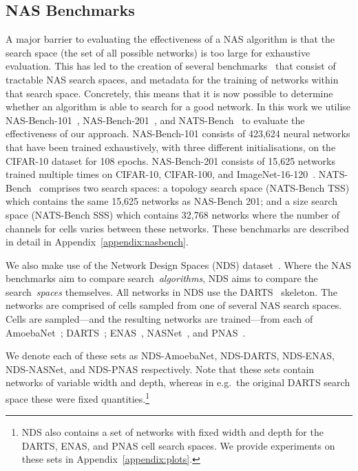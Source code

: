 \documentclass{article}
\begin{document}
\subsection{NAS Benchmarks}
\label{sec:nasbench101}
A major barrier to evaluating the effectiveness of a NAS algorithm is that the search space (the set of all possible networks) is too large for exhaustive evaluation. This has led to the creation of several benchmarks~\citep{ying2019bench,Zela2020NAS-Bench-1Shot1:,Dong2020NAS-Bench-201,dong2021nats} that consist of tractable NAS search spaces, and metadata for the training of networks within that search space. Concretely, this means that it is now possible to determine whether an algorithm is able to search for a good network. In this work we utilise NAS-Bench-101~\citep{ying2019bench}, NAS-Bench-201~\citep{Dong2020NAS-Bench-201}, and NATS-Bench~\citep{dong2021nats} to evaluate the effectiveness of our approach. NAS-Bench-101 consists of 423,624 neural networks that have been trained exhaustively, with three different initialisations, on the CIFAR-10 dataset for 108 epochs. NAS-Bench-201 consists of 15,625 networks trained multiple times on CIFAR-10, CIFAR-100, and ImageNet-16-120~\citep{chrabaszcz2017downsampled}. NATS-Bench~\citep{dong2021nats} comprises two search spaces: a topology search space (NATS-Bench TSS) which contains the same 15,625 networks as NAS-Bench 201; and a size search space (NATS-Bench SSS) which contains 32,768 networks where the number of channels for cells varies between these networks.
These benchmarks are described in detail in Appendix~\ref{appendix:nasbench}.


We also make use of the Network Design Spaces (NDS) dataset~\citep{radosavovic2019network}. Where the NAS benchmarks aim to compare search~\textit{algorithms}, NDS aims to compare the search~\textit{spaces} themselves. All networks in NDS use the DARTS~\citep{liu2019darts} skeleton. The networks are comprised of cells sampled from one of several NAS search spaces. Cells are sampled---and the resulting networks are trained---from each of AmoebaNet~\citep{real2019regularized}; DARTS~\citep{liu2019darts}; ENAS~\citep{pham2018efficient},  NASNet~\citep{zoph2017neural}, and
PNAS~\citep{liu2018progressive}. 

We denote each of these sets as NDS-AmoebaNet, NDS-DARTS, NDS-ENAS, NDS-NASNet, and NDS-PNAS respectively. Note that these sets contain networks of variable width and depth, whereas in e.g.\ the original DARTS search space these were fixed quantities.\footnote{NDS also contains a set of networks with fixed width and depth for the DARTS, ENAS, and PNAS cell search spaces. We provide experiments on these sets in Appendix~\ref{appendix:plots}.}
\end{document}
